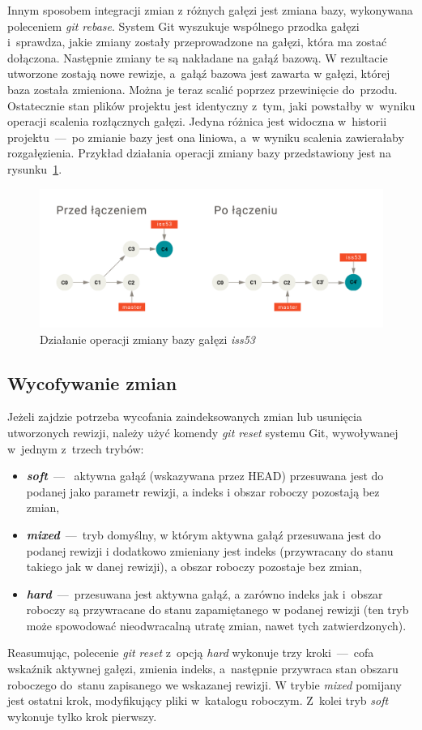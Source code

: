 \documentclass[12pt,a4paper,polish,thesis]{dcsbook}
\begin{document}
	Innym sposobem integracji zmian z różnych gałęzi jest zmiana bazy, wykonywana poleceniem \textit{git rebase}. System Git wyszukuje wspólnego przodka gałęzi i~sprawdza, jakie zmiany zostały przeprowadzone na gałęzi, która ma zostać dołączona. Następnie zmiany te są nakładane na gałąź bazową. W rezultacie utworzone zostają nowe rewizje, a~gałąź bazowa jest zawarta w gałęzi, której baza została zmieniona. Można je teraz scalić poprzez przewinięcie do~przodu. Ostatecznie stan plików projektu jest identyczny z~tym, jaki powstałby w~wyniku operacji scalenia rozłącznych gałęzi. Jedyna różnica jest widoczna w~historii projektu~---~po zmianie bazy jest ona liniowa, a~w wyniku scalenia zawierałaby rozgałęzienia. Przykład działania operacji zmiany bazy przedstawiony jest na rysunku~\ref{fig:git-rebase}.

	\begin{figure}[h]
		\centering
		\includegraphics[width=13cm]{git-rebase}
		\caption{Działanie operacji zmiany bazy gałęzi \textit{iss53} }
		\label{fig:git-rebase}
	\end{figure}
	\FloatBarrier

	\subsection{Wycofywanie zmian}
	Jeżeli zajdzie potrzeba wycofania zaindeksowanych zmian lub usunięcia utworzonych rewizji, należy użyć komendy \textit{git reset} systemu Git, wywoływanej w~jednym z~trzech trybów:
	\begin{itemize}
		\item \textbf{\textit{soft}}~---~ aktywna gałąź (wskazywana przez HEAD) przesuwana jest do podanej jako parametr rewizji, a indeks i obszar roboczy pozostają bez zmian,
		\item \textbf{\textit{mixed}}~---~tryb domyślny, w którym aktywna gałąź przesuwana jest do podanej rewizji i dodatkowo zmieniany jest indeks (przywracany do stanu takiego jak w danej rewizji), a obszar roboczy pozostaje bez zmian,
		\item \textbf{\textit{hard}}~---~przesuwana jest aktywna gałąź, a zarówno indeks jak i~obszar roboczy są przywracane do stanu zapamiętanego w podanej rewizji (ten tryb może spowodować nieodwracalną utratę zmian, nawet tych zatwierdzonych).
	\end{itemize}
	Reasumując, polecenie \textit{git reset} z~opcją \textit{hard} wykonuje trzy kroki~---~cofa wskaźnik aktywnej gałęzi, zmienia indeks, a~następnie przywraca stan obszaru roboczego do~stanu zapisanego we wskazanej rewizji. W trybie \textit{mixed} pomijany jest ostatni krok, modyfikujący pliki w~katalogu roboczym. Z~kolei tryb \textit{soft} wykonuje tylko krok pierwszy.
\end{document}
